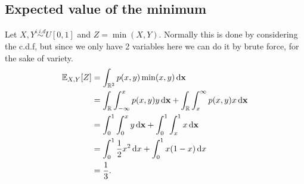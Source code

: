 \subsection{Expected value of the minimum}
Let $X,Y\overset{i.i.d}{\sim}U[0,1]$ and $Z = \min(X,Y)$. Normally this is done by considering the c.d.f, but since we only have 2 variables here we can do it by brute force, for the sake of variety.
\begin{align*}
\mathbb{E}_{X,Y}[Z] &= \int_{\mathbb{R}^2} p(x,y)\min(x,y) \mathop{}\!\mathrm{d} \mathbf{x}\\
&= \int_{\mathbb{R}} \int_{-\infty}^{x} p(x,y)y \mathop{}\!\mathrm{d} \mathbf{x} + \int_{\mathbb{R}} \int_{x}^{\infty} p(x,y)x \mathop{}\!\mathrm{d} \mathbf{x}\\
&= \int_{0}^{1} \int_{0}^{x} y \mathop{}\!\mathrm{d} \mathbf{x} + \int_{0}^{1} \int_{x}^{1} x \mathop{}\!\mathrm{d} \mathbf{x}\\
&= \int_{0}^{1} \frac{1}{2}x^2 \mathop{}\!\mathrm{d} x + \int_{0}^{1} x(1-x) \mathop{}\!\mathrm{d} x\\
&= \frac{1}{3}.
\end{align*}
